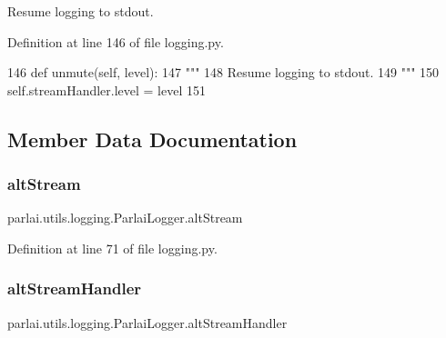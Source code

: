 \begin{DoxyVerb}Resume logging to stdout.
\end{DoxyVerb}
 

Definition at line 146 of file logging.\+py.


\begin{DoxyCode}
146     \textcolor{keyword}{def }unmute(self, level):
147         \textcolor{stringliteral}{"""}
148 \textcolor{stringliteral}{        Resume logging to stdout.}
149 \textcolor{stringliteral}{        """}
150         self.streamHandler.level = level
151 
\end{DoxyCode}


\subsection{Member Data Documentation}
\mbox{\label{classparlai_1_1utils_1_1logging_1_1ParlaiLogger_a5b1bdad4c97a74ea4e38f678ae0edd2c}} 
\subsubsection{\texorpdfstring{alt\+Stream}{altStream}}
{\footnotesize\ttfamily parlai.\+utils.\+logging.\+Parlai\+Logger.\+alt\+Stream}



Definition at line 71 of file logging.\+py.

\mbox{\label{classparlai_1_1utils_1_1logging_1_1ParlaiLogger_acaf2a0925cad1af3df14b3776f900f55}} 
\subsubsection{\texorpdfstring{alt\+Stream\+Handler}{altStreamHandler}}
{\footnotesize\ttfamily parlai.\+utils.\+logging.\+Parlai\+Logger.\+alt\+Stream\+Handler}



